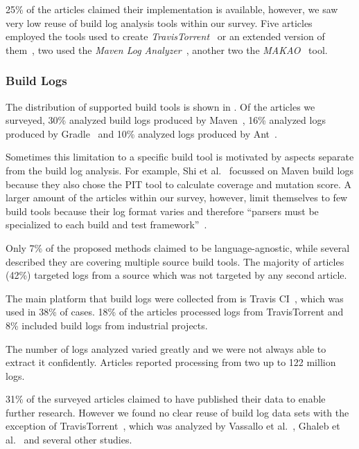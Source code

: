 25\% of the articles claimed their implementation is available,
however, we
saw very low reuse of build log analysis tools within our survey.
Five articles employed the tools used to create
\emph{TravisTorrent}~\cite{beller2017travistorrent,beller2017oops,
orellana2017differences,zhao2018comparing} or
an extended version of them~\cite{rott2019empirische,
shi2018evaluating},
two used the
\emph{Maven Log Analyzer}~\cite{macho2018automatically,gallaba2018noise},
another two the
\emph{MAKAO}~\cite{wen2018blimp,adams2007design,adams2007makao} tool.

\subsubsection{Build Logs}
The distribution of supported build tools is shown in
.
Of the articles we surveyed, 30\% analyzed build logs produced by
Maven~\cite{maven2019website}, 16\% analyzed logs produced by
Gradle~\cite{gradle2020website}
and 10\% analyzed logs produced by Ant~\cite{ant2020website}.

Sometimes this limitation to a specific build tool is motivated by
aspects separate from the build log analysis.
For example, Shi et al.~\cite{shi2018evaluating} focussed on Maven
build logs because they also chose the PIT tool to calculate coverage
and mutation score.
A larger amount of the articles within our survey, however, limit
themselves to few build tools because their log format varies and
therefore ``parsers must be specialized to each build and test
framework''~\cite{tomassi2019bugswarm}.

Only 7\% of the proposed methods claimed to be language-agnostic, while
several described they are covering multiple source build tools.
The majority of articles (42\%) targeted logs from a source which was not
targeted by any second article.

The main platform that build logs were collected from is Travis
CI~\cite{travisci2019webpage},
which was used in 38\% of cases.
18\% of the articles processed logs from TravisTorrent and 8\% included
build logs from industrial projects.

The number of logs analyzed varied greatly and we were not always able to
extract it confidently.
Articles reported processing from two up to 122 million logs.

31\% of the surveyed articles claimed to have published their data to
enable further research.
However we found no clear reuse of build log data sets with the
exception of TravisTorrent~\cite{beller2017travistorrent}, which was
analyzed by Vassallo et al.~\cite{vassallo2017a-tale},
Ghaleb et al.~\cite{ghaleb2019studying} and several other studies.

